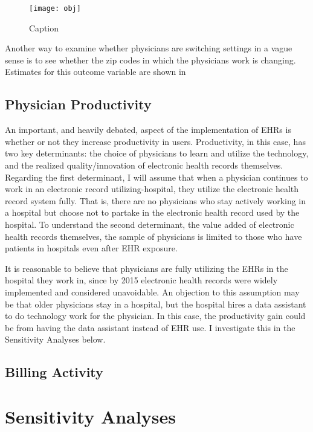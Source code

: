 \documentclass[11pt]{article}
\begin{document}
\begin{figure}
    \centering
    \texttt{[image: obj]}
    \caption{Caption}
    \label{fig:my_label}
\end{figure}
Another way to examine whether physicians are switching settings in a vague sense is to see whether the zip codes in which the physicians work is changing. Estimates for this outcome variable are shown in




\subsection{Physician Productivity}

An important, and heavily debated, aspect of the implementation of EHRs is whether or not they increase productivity in users. Productivity, in this case, has two key determinants: the choice of physicians to learn and utilize the technology, and the realized quality/innovation of electronic health records themselves. Regarding the first determinant, I will assume that when a physician continues to work in an electronic record utilizing-hospital, they utilize the electronic health record system fully. That is, there are no physicians who stay actively working in a hospital but choose not to partake in the electronic health record used by the hospital. To understand the second determinant, the value added of electronic health records themselves, the sample of physicians is limited to those who have patients in hospitals even after EHR exposure. 

It is reasonable to believe that physicians are fully utilizing the EHRs in the hospital they work in, since by 2015 electronic health records were widely implemented and considered unavoidable. An objection to this assumption may be that older physicians stay in a hospital, but the hospital hires a data assistant to do technology work for the physician. In this case, the productivity gain could be from having the data assistant instead of EHR use. I investigate this in the Sensitivity Analyses below.

\subsection{Billing Activity}

\section{Sensitivity Analyses}
\end{document}
